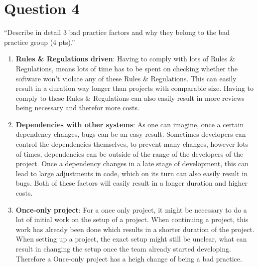 \section{Question 4}

``Describe in detail 3 bad practice factors and why they belong to the bad practice group (4 pts).'' \\

\begin{enumerate}
	\item \textbf{Rules \& Regulations driven}: Having to comply with lots of Rules \& Regulations, means lots of time has to be spent on checking whether the software won't violate any of these Rules \& Regulations. This can easily result in a duration way longer than projects with comparable size. Having to comply to these Rules \& Regulations can also easily result in more reviews being necessary and therefor more costs. 
	\item \textbf{Dependencies with other systems}: As one can imagine, once a certain dependency changes, bugs can be an easy result. Sometimes developers can control the dependencies themselves, to prevent many changes, however lots of times, dependencies can be outside of the range of the developers of the project. Once a dependency changes in a late stage of development, this can lead to large adjustments in code, which on its turn can also easily result in bugs. Both of these factors will easily result in a longer duration and higher costs. 
	\item \textbf{Once-only project}: For a once only project, it might be necessary to do a lot of initial work on the setup of a project. When continuing a project, this work has already been done which results in a shorter duration of the project. When setting up a project, the exact setup might still be unclear, what can result in changing the setup once the team already started developing. Therefore a Once-only project has a heigh change of being a bad practice. 
\end{enumerate}